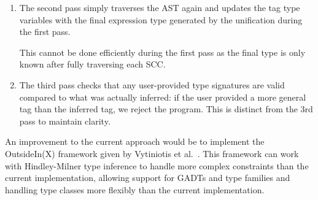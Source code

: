 \documentclass[dissertation.tex]{subfiles}
\begin{document}
{{\begin{enumerate}
{            Overloaded functions present a difference from the HM rules, as some expressions generate typeclass constraints on the type variables involved: using an overloaded function like \haskell{(+)} will first require instantiating its polymorphic type to an overloaded type (\(\forall\alpha.\;\text{Num }\alpha\Rightarrow\alpha\rightarrow\alpha\rightarrow\alpha\) to \(\text{Num }\beta\Rightarrow\beta\rightarrow\beta\rightarrow\beta\), where \(\beta\) is a fresh unique type variable), then moving the constraints from the type into a set of constraints built up while traversing this declaration to get just \(\beta\rightarrow\beta\rightarrow\beta\). This is the ground type that is unified with the type variable used to tag the use of \haskell{(+)}, and the type constraints are stored for use after finishing traversing the SCC.

            After all declarations in an SCC have been fully traversed, types are generated for all the variable names bound. This involves adding explicit quantifiers and constraints to the simple type inferred for the top-level expression on the right-hand side of the binding. All type variables within the simple type that are not already in scope from eg.\ a class definition are added as universally quantified variables, and any constraints generated during processing the declaration involving type variables free in the simple type, are added as the qualifiers to the type.
        }
        \item
        {
            The second pass simply traverses the AST again and updates the tag type variables with the final expression type generated by the unification during the first pass.
            
            This cannot be done efficiently during the first pass as the final type is only known after fully traversing each SCC.
        }
        \item
        {
            The third pass checks that any user-provided type signatures are valid compared to what was actually inferred: if the user provided a more general tag than the inferred tag, we reject the program. This is distinct from the 3rd pass to maintain clarity.
        }
        \end{enumerate}

        An improvement to the current approach would be to implement the OutsideIn(X) framework given by Vytiniotis et al.\ \cite{OutsideIn}. This framework can work with Hindley-Milner type inference to handle more complex constraints than the current implementation, allowing support for GADTs and type families and handling type classes more flexibly than the current implementation.

}}
\end{document}
